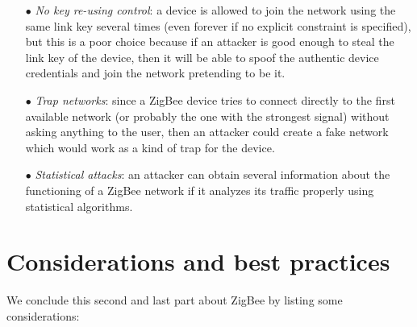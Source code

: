 \documentclass[12pt]{report}
\begin{document}
\begin{itemize}
\begin{itemize}
\end{itemize}

\item[$\bullet$] \emph{No key re-using control}: a device is allowed to join the network using the same link key several times (even forever if no explicit constraint is specified), but this is a poor choice because if an attacker is good enough to steal the link key of the device, then it will be able to spoof the authentic device credentials and join the network pretending to be it.

\item[$\bullet$] \emph{Trap networks}: since a ZigBee device tries to connect directly to the first available network (or probably the one with the strongest signal) without asking anything to the user, then an attacker could create a fake network which would work as a kind of trap for the device.

\item[$\bullet$] \emph{Statistical attacks}: an attacker can obtain several information about the functioning of a ZigBee network if it analyzes its traffic properly using statistical algorithms.\\ 
\end{itemize}

\clearpage
\section{Considerations and best practices}
\bigskip
We conclude this second and last part about ZigBee by listing some considerations:
\end{document}
